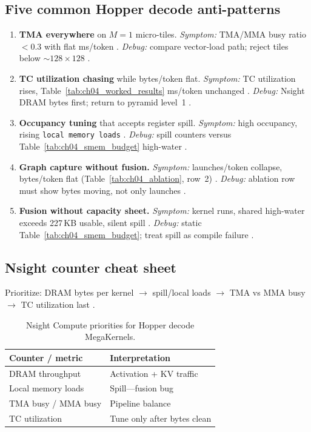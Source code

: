 \subsection{Five common Hopper decode anti-patterns}
\begin{enumerate}
\item \textbf{TMA everywhere} on $M{=}1$ micro-tiles.
\emph{Symptom:} TMA/MMA busy ratio ${<}0.3$ with flat ms/token \citep{semianalysis2024tma}.
\emph{Debug:} compare vector-load path; reject tiles below ${\sim}128{\times}128$ \citep{taxbreak2026,dlbook}.

\item \textbf{TC utilization chasing} while bytes/token flat.
\emph{Symptom:} TC utilization rises, Table~\ref{tab:ch04_worked_results} ms/token unchanged \citep{memoryfloor2026}.
\emph{Debug:} Nsight DRAM bytes first; return to pyramid level~1 \citep{patel2025llminference}.

\item \textbf{Occupancy tuning} that accepts register spill.
\emph{Symptom:} high occupancy, rising \texttt{local memory loads} \citep{yirage2026}.
\emph{Debug:} spill counters versus Table~\ref{tab:ch04_smem_budget} high-water \citep{memoryfloor2026}.

\item \textbf{Graph capture without fusion.}
\emph{Symptom:} launches/token collapse, bytes/token flat (Table~\ref{tab:ch04_ablation}, row~2) \citep{nvidia2024cudagraphs}.
\emph{Debug:} ablation row must show bytes moving, not only launches \citep{memoryfloor2026}.

\item \textbf{Fusion without capacity sheet.}
\emph{Symptom:} kernel runs, shared high-water exceeds 227\,KB usable, silent spill \citep{nvidia2022hopper}.
\emph{Debug:} static Table~\ref{tab:ch04_smem_budget}; treat spill as compile failure \citep{yirage2026,memoryfloor2026}.
\end{enumerate}

\subsection{Nsight counter cheat sheet}
Prioritize: DRAM bytes per kernel $\rightarrow$ spill/local loads $\rightarrow$ TMA vs MMA busy $\rightarrow$ TC utilization last \citep{patel2025llminference,semianalysis2024tma,memoryfloor2026}.

\begin{table}[t]
\centering
\small
\caption{Nsight Compute priorities for Hopper decode MegaKernels.}
\label{tab:nsight_cheatsheet}
\begin{tabular}{@{}ll@{}}
\toprule
\textbf{Counter / metric} & \textbf{Interpretation} \\
\midrule
DRAM throughput & Activation + KV traffic \\
Local memory loads & Spill---fusion bug \\
TMA busy / MMA busy & Pipeline balance \\
TC utilization & Tune only after bytes clean \\
\bottomrule
\end{tabular}
\end{table}

